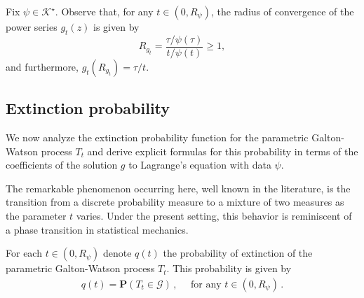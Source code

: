 \documentclass[11pt,a4paper,leqno]{amsart}
\theoremstyle{plain}
\theoremstyle{definition}
\numberwithin{equation}{section}
\def\P{\mathbf{P}}
\begin{document}
	
	Fix \( \psi \in \mathcal{K}^{\star} \). Observe that, for any \( t \in (0, R_{\psi}) \), the radius of convergence of the power series \( g_t(z) \) is given by
	\[
	R_{g_t} = \frac{\tau / \psi(\tau)}{t / \psi(t)} \geq 1,
	\]
	and furthermore, \( g_t(R_{g_t}) = \tau / t \).
	
	
	\subsection{Extinction probability}\label{subsec: extinction_tree}
	
	We now analyze the extinction probability function for the parametric Galton-Watson process \( T_t \) and derive explicit formulas for this probability in terms of the coefficients of the solution \( g \) to Lagrange's equation with data \( \psi \).
	\smallskip
	
	The remarkable phenomenon occurring here, well known in the literature, is the transition from a discrete probability measure to a mixture of two measures as the parameter \( t \) varies. Under the present setting, this behavior is reminiscent of a phase transition in statistical mechanics.
	\smallskip
	
	
	For each $t \in (0,R_{\psi})$ denote $q(t)$ the probability of extinction of the parametric Galton-Watson process $T_t$. This probability is given by
	\begin{align*}
		q(t) = \P(T_t \in \mathcal{G})\,, \quad \text{ for any } t \in (0,R_{\psi})\,.
	\end{align*}
	
\end{document}
